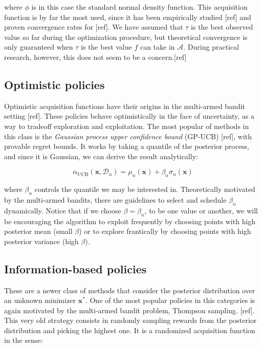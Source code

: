 \documentclass[10pt,a4paper,twoside]{book}
\begin{document}
where $\phi$ is in this case the standard normal density function. This acquisition function is by far the most used, since it has been empirically studied [ref] and proven convergence rates for [ref]. We have assumed that $\tau$ is the best observed value so far during the optimization procedure, but theoretical convergence is only guaranteed when $\tau$ is the best value $f$ can take in $\mathcal{A}$. During practical research, however, this does not seem to be a concern.[ref] 

\subsection{Optimistic policies}

Optimistic acquisition functions have their origins in the multi-armed bandit setting [ref]. These policies behave optimistically in the face of uncertainty, as a way to tradeoff exploration and exploitation. The most popular of methods in this class is the \textit{Gaussian process upper confidence bound} (GP-UCB) [ref], with provable regret bounds. It works by taking a quantile of the posterior process, and since it is Gaussian, we can derive the result analytically:

\begin{equation}
\alpha_{\mathrm{UCB}}(\boldsymbol{x}, \mathcal{D}_n) = \mu_n(\boldsymbol{x}) + \beta_n\sigma_n(\boldsymbol{x})
\end{equation}

where $\beta_n$ controls the quantile we may be interested in. Theoretically motivated by the multi-armed bandits, there are guidelines to select and schedule $\beta_n$ dynamically. Notice that if we choose $\beta = \beta_n$, to be one value or another, we will be encouraging the algorithm to exploit frequently by choosing points with high posterior mean (small $\beta$) or to explore frantically by choosing points with high posterior variance (high $\beta$).

\subsection{Information-based policies}

These are a newer class of methods that consider the posterior distribution over an unknown minimizer $\boldsymbol{x}^*$. One of the most popular policies in this categories is again motivated by the multi-armed bandit problem, Thompson sampling. [ref]. This very old strategy consists in randomly sampling rewards from the posterior distribution and picking the highest one. It is a randomized acquisition function in the sense:
\end{document}

